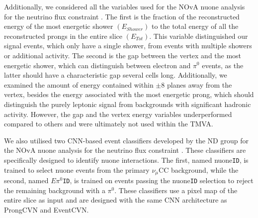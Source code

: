 Additionally, we considered all the variables used for the \gls{NOvA} \gls{nuone} analysis for the neutrino flux constraint \cite{NOVA-doc-56383}. The first is the fraction of the reconstructed energy of the most energetic shower $\left(E_{Shower}\right)$ to the total energy of all the reconstructed prongs in the entire slice $\left(E_{Tot}\right)$. This variable distinguished our signal events, which only have a single shower, from events with multiple showers or additional activity. The second is the gap between the vertex and the most energetic shower, which can distinguish between electron and $\pi^0$ events, as the latter should have a characteristic gap several cells long. Additionally, we examined the amount of energy contained within $\pm8$ planes away from the vertex, besides the energy associated with the most energetic prong, which should distinguish the purely leptonic signal from backgrounds with significant hadronic activity. However, the gap and the vertex energy variables underperformed compared to others and were ultimately not used within the \gls{TMVA}.

We also utilised two \gls{CNN}-based event classifiers developed by the \gls{ND} group for the \gls{NOvA} \gls{nuone} analysis for the neutrino flux constraint \cite{NOVA-doc-56383}. These classifiers are specifically designed to identify \gls{nuone} interactions. The first, named \gls{nuone}\texttt{ID}, is trained to select \gls{nuone} events from the primary $\nu_\mu$\gls{CC} background, while the second, named $E\pi^0$\texttt{ID}, is trained on events passing the \gls{nuone}\texttt{ID} selection to reject the remaining background with a $\pi^0$. These classifiers use a pixel map of the entire slice as input and are designed with the same \gls{CNN} architecture as ProngCVN and EventCVN.

